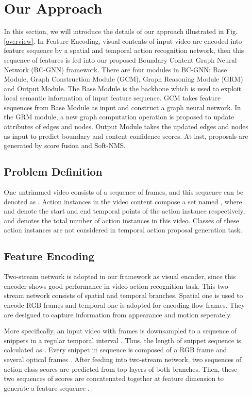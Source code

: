 \documentclass[runningheads]{llncs}
\begin{document}
\section{Our Approach}
In this section, we will introduce the details of our approach illustrated in Fig.\ref{overview}. In Feature Encoding, visual contents of input video are encoded into feature sequence by a spatial and temporal action recognition network, then this sequence of features is fed into our proposed Boundary Content Graph Neural Network (BC-GNN) framework. There are four modules in BC-GNN: Base Module, Graph Construction Module (GCM), Graph Reasoning Module (GRM) and Output Module. The Base Module is the backbone which is used to exploit local semantic information of input feature sequence. GCM takes feature sequences from Base Module as input and construct a graph neural network. In the GRM module, a new graph computation operation is proposed to update attributes of edges and nodes. Output Module takes the updated edges and nodes as input to predict boundary and content confidence scores. At last, proposals are generated by score fusion and Soft-NMS.

\subsection{Problem Definition}
One untrimmed video consists of a sequence of  frames, and this sequence can be denoted as . Action instances in the video content compose a set named , where  and  denote the start and end temporal points of the   action instance respectively, and  denotes the total number of action instances in this video. Classes of these action instances are not considered in temporal action proposal generation task. 

\subsection{Feature Encoding}
Two-stream network \cite{two-stream} is adopted in our framework as visual encoder, since this encoder shows good performance in video action recognition task. This two-stream network consists of spatial and temporal branches. Spatial one is used to encode RGB frames and temporal one is adopted for encoding flow frames. They are designed to capture information from appearance and motion seperately.

More specifically, an input video  with  frames is downsampled to a sequence of  snippets  in a regular temporal interval . Thus, the length of snippet sequence  is calculated as . Every snippet  in sequence  is composed of a RGB frame  and several optical frames . After feeding  into two-stream network, two sequences of action class scores are predicted from top layers of both branches. Then, these two sequences of scores are concatenated together at feature dimension to generate a feature sequence .
\end{document}
